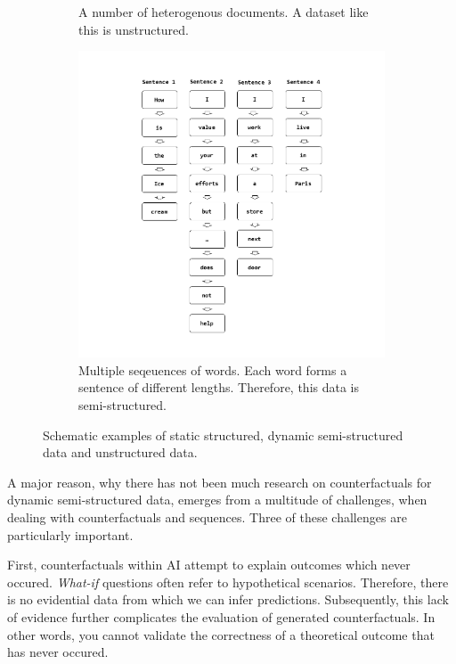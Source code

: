 \documentclass[./../../paper.tex]{subfiles}
\begin{document}
\begin{figure}
\begin{subfigure}[c]{0.49\textwidth}
        \caption{A number of heterogenous documents. A dataset like this is unstructured.}
        \label{fig:unstructured}
    \end{subfigure}
    \hfill
    \begin{subfigure}[c]{0.7\textwidth}
        \centering
        \includegraphics[width=\textwidth]{figures/Graphics/Slide2.png}
        \caption{Multiple seqeuences of words. Each word forms a sentence of different lengths. Therefore, this data is semi-structured.}
        \label{fig:semistructured}
    \end{subfigure}
       \caption{Schematic examples of static structured, dynamic semi-structured data and unstructured data.}
       \label{fig:example_structure}
\end{figure}


A major reason, why there has not been much research on counterfactuals for dynamic semi-structured data, emerges from a multitude of challenges, when dealing with counterfactuals and sequences. Three of these challenges are particularly important.
 
First, counterfactuals within AI attempt to explain outcomes which never occured. \emph{What-if} questions often refer to hypothetical scenarios. Therefore, there is no evidential data from which we can infer predictions. Subsequently, this lack of evidence further complicates the evaluation of generated counterfactuals. In other words, you cannot validate the correctness of a theoretical outcome that has never occured.
\end{document}

